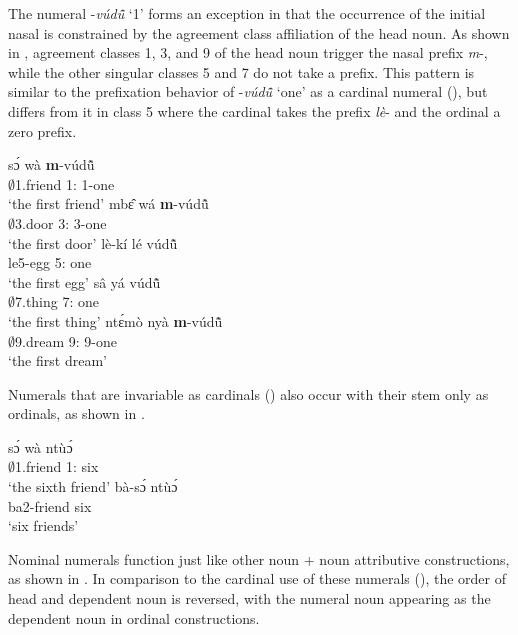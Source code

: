     
    


The numeral -{\itshape vúdũ̂} `1' forms an exception in that the occurrence of the initial nasal is constrained by the agreement class affiliation of the head noun. As shown in , agreement classes 1, 3, and 9 of the head noun trigger the nasal prefix {\itshape m}-, while the other singular classes 5 and 7 do not take a prefix. This pattern is similar to the prefixation behavior of -{\itshape vúdũ̂} `one' as a cardinal numeral (), but differs from it in class 5 where the cardinal takes the prefix {\itshape lè}- and the ordinal a zero prefix. 

\ea\label{Ordonex}
\ea \label{Ordonex1}
  \gll   sɔ́ wà {\bfseries m}-vúdũ̂\\
                $\emptyset$1.friend 1:{\ATT} 1-one \\
    \trans `the first friend'
\ex\label{Ordonex2}
 \gll  mbɛ̂ wá {\bfseries m}-vúdũ̂ \\
         $\emptyset$3.door 3:{\ATT} 3-one \\
    \trans `the first door'
\ex\label{Ordonex3}
 \gll  lè-kí lé vúdũ̂ \\
               le5-egg 5:{\ATT} one \\
    \trans `the first egg'
\ex\label{Ordonex4}
 \gll  sâ yá vúdũ̂ \\
              $\emptyset$7.thing 7:{\ATT} one \\
    \trans `the first thing'
\ex\label{Ordonex5}
 \gll ntɛ́mò nyà {\bfseries m}-vúdũ̂ \\
              $\emptyset$9.dream 9:{\ATT} 9-one \\
    \trans `the first dream'
\z
\z

Numerals that are invariable as cardinals () also occur with their stem only as ordinals, as shown in . 

\ea\label{Ordsix}
\ea\label{Ordsix1}
 \gll  sɔ́ wà ntùɔ́ \\
        $\emptyset$1.friend 1:{\ATT} six \\
    \trans `the sixth friend'
\ex\label{Ordsix2}
\gll  bà-sɔ́ ntùɔ́ \\
        ba2-friend six \\
    \trans `six friends'
\z    
\z


Nominal numerals function just like other noun + noun attributive constructions, as shown in . In comparison to the cardinal use of these numerals (), the order of head and dependent noun is reversed, with the numeral noun appearing as the dependent noun in ordinal constructions. 


